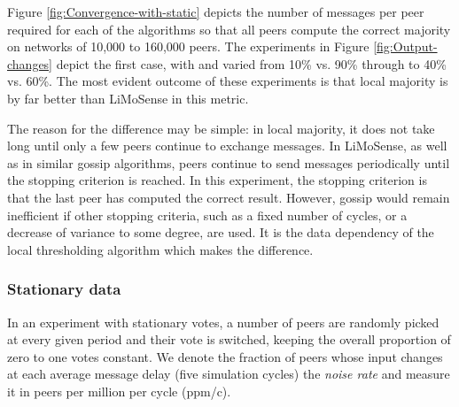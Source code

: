 \documentclass[12pt,english,journal]{elsarticle}
\numberwithin{equation}{section}
\numberwithin{figure}{section}
\theoremstyle{plain}
\theoremstyle{plain}
\begin{document}
Figure \ref{fig:Convergence-with-static} depicts the number of messages
per peer required for each of the algorithms so that all peers compute
the correct majority on networks of 10,000 to 160,000 peers. The experiments
in Figure \ref{fig:Output-changes} depict the first case, with 
and  varied from 10\% vs. 90\% through to 40\% vs. 60\%.
The most evident outcome of these experiments is that local majority
is by far better than LiMoSense in this metric. 

The reason for the difference may be simple: in local majority, it
does not take long until only a few peers continue to exchange messages.
In LiMoSense, as well as in similar gossip algorithms, peers continue
to send messages periodically until the stopping criterion is reached.
In this experiment, the stopping criterion is that the last peer has
computed the correct result. However, gossip would remain inefficient
if other stopping criteria, such as a fixed number of cycles, or a
decrease of variance to some degree, are used. It is the data dependency
of the local thresholding algorithm which makes the difference. 



\begin{figure*}[p]
\caption{\label{fig:Convergence-with-static}Messages until convergence with
static data}


\begin{minipage}[t]{0.5\textwidth}\end{minipage}\begin{minipage}[t]{0.5\textwidth}\end{minipage}
\end{figure*}





\subsubsection{Stationary data}

In an experiment with stationary votes, a number of peers are randomly
picked at every given period and their vote is switched, keeping the
overall proportion of zero to one votes constant. We denote the fraction
of peers whose input changes at each average message delay (five simulation
cycles) the \emph{noise rate} and measure it in peers per million
per cycle (ppm/c). 
\end{document}
